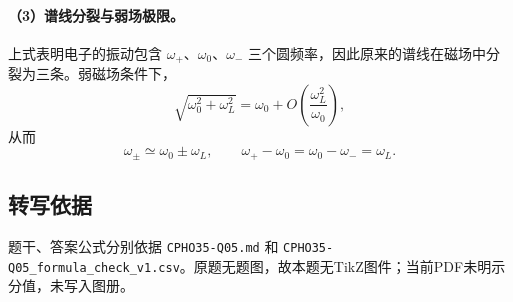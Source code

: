 \paragraph{（3）谱线分裂与弱场极限。} 上式表明电子的振动包含 $\omega_+$、$\omega_0$、$\omega_-$ 三个圆频率，因此原来的谱线在磁场中分裂为三条。弱磁场条件下，
\[
\sqrt{\omega_0^2+\omega_L^2}
=\omega_0+O\!\left(\frac{\omega_L^2}{\omega_0}\right),
\]
从而
\[
\omega_\pm\simeq\omega_0\pm\omega_L,\qquad
\boxed{\omega_+-\omega_0=\omega_0-\omega_-=\omega_L.}
\]

\subsection{转写依据}
题干、答案公式分别依据 \texttt{CPHO35-Q05.md} 和 \texttt{CPHO35-Q05\_formula\_check\_v1.csv}。原题无题图，故本题无TikZ图件；当前PDF未明示分值，未写入图册。
